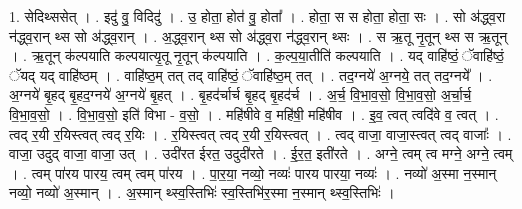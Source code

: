 \documentclass[17pt]{extarticle}
\begin{document}
1. सेदिथ्ससेत् । . इदु॑ वु॒ विदिदु॑ । . उ॒ होता॒ होत॑ वु॒ होता᳚ । . होता॒ स स होता॒ होता॒ सः । . सो अ॑द्ध्व॒रा न॑द्ध्व॒रान् थ्स सो अ॑द्ध्व॒रान् । . अ॒द्ध्व॒रान् थ्स सो अ॑द्ध्व॒रा न॑द्ध्व॒रान् थ्सः । . स ऋ॒तू नृ॒तून् थ्स स ऋ॒तून् । . ऋ॒तून् क॑ल्पयाति कल्पयात्यृ॒तू नृ॒तून् क॑ल्पयाति । . क॒ल्प॒या॒तीति॑ कल्पयाति । . यद् वाहि॑ष्ठं॒ ॅवाहि॑ष्ठं॒ ॅयद् यद् वाहि॑ष्ठम् । . वाहि॑ष्ठ॒म् तत् तद् वाहि॑ष्ठं॒ ॅवाहि॑ष्ठ॒म् तत् । . तद॒ग्नये॑ अ॒ग्नये॒ तत् तद॒ग्नये᳚ । . अ॒ग्नये॑ बृ॒हद् बृ॒हद॒ग्नये॑ अ॒ग्नये॑ बृ॒हत् । . बृ॒हद॑र्चार्च बृ॒हद् बृ॒हद॑र्च । . अ॒र्च॒ वि॒भा॒व॒सो॒ वि॒भा॒व॒सो॒ अ॒र्चा॒र्च॒ वि॒भा॒व॒सो॒ । . वि॒भा॒व॒सो॒ इति॑ विभा - व॒सो॒ । . महि॑षीवे व॒ महि॑षी॒ महि॑षीव । . इ॒व॒ त्वत् त्वदि॑वे व॒ त्वत् । . त्वद् र॒यी र॒यिस्त्वत् त्वद् र॒यिः । . र॒यिस्त्वत् त्वद् र॒यी र॒यिस्त्वत् । . त्वद् वाजा॒ वाजा॒स्त्वत् त्वद् वाजाः᳚ । . वाजा॒ उदुद् वाजा॒ वाजा॒ उत् । . उदी॑रत ईरत॒ उदुदी॑रते । . ई॒र॒त॒ इती॑रते । . अग्ने॒ त्वम् त्व मग्ने॒ अग्ने॒ त्वम् । . त्वम् पा॑रय पारय॒ त्वम् त्वम् पा॑रय । . पा॒र॒या॒ नव्यो॒ नव्यः॑ पारय पारया॒ नव्यः॑ । . नव्यो॑ अ॒स्मा न॒स्मान् नव्यो॒ नव्यो॑ अ॒स्मान् । . अ॒स्मान् थ्स्व॒स्तिभिः॑ स्व॒स्तिभि॑र॒स्मा न॒स्मान् थ्स्व॒स्तिभिः॑ । \newline
\end{document}
